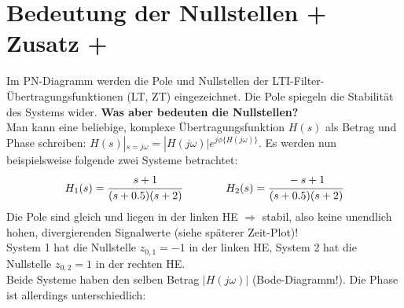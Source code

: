 \documentclass[a4paper,11pt]{article}
\begin{document}
\section*{Bedeutung der Nullstellen \footnotesize + Zusatz +} 
Im PN-Diagramm werden die Pole und Nullstellen der LTI-Filter-Übertragungsfunktionen (LT, ZT) eingezeichnet. Die Pole spiegeln die Stabilität des Systems wider. \textbf{Was aber bedeuten die Nullstellen?}
\\Man kann eine beliebige, komplexe Übertragungsfunktion $H(s)$ als Betrag und Phase schreiben: $H(s)|_{s=j\omega}=|H(j\omega)|e^{j\phi\{H(j\omega)\}}$. 
Es werden nun beispielsweise folgende zwei Systeme betrachtet:
$$H_1(s)=\cfrac{s+1}{(s+0.5)(s+2)}\qquad\qquad H_2(s)=\cfrac{-s+1}{(s+0.5)(s+2)}$$
Die Pole sind gleich und liegen in der linken HE $\Rightarrow$ stabil, also keine unendlich hohen, divergierenden Signalwerte (siehe späterer  Zeit-Plot)!
\\System 1 hat die Nullstelle $z_{0,1}=-1$ in der linken HE, System 2 hat die Nullstelle $z_{0,2}=1$ in der rechten HE.
\\Beide Systeme haben den selben Betrag $|H(j\omega)|$ (Bode-Diagramm!). Die Phase ist allerdings unterschiedlich:
\end{document}
